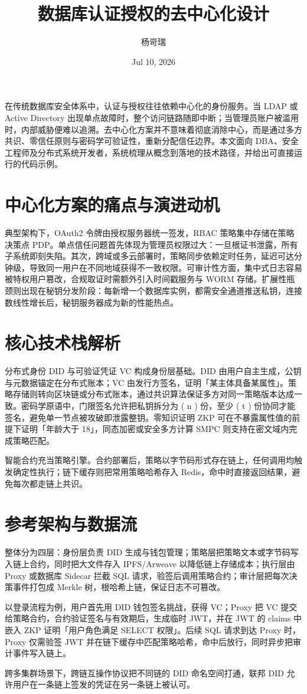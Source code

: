 \title{数据库认证授权的去中心化设计}
\author{杨岢瑞}
\date{Jul 10, 2026}
\maketitle
在传统数据库安全体系中，认证与授权往往依赖中心化的身份服务。当 LDAP 或 Active Directory 出现单点故障时，整个访问链路随即中断；当管理员账户被滥用时，内部威胁便难以追溯。去中心化方案并不意味着彻底消除中心，而是通过多方共识、零信任原则与密码学可验证性，重新分配信任边界。本文面向 DBA、安全工程师及分布式系统开发者，系统梳理从概念到落地的技术路径，并给出可直接运行的代码示例。\par
\chapter{中心化方案的痛点与演进动机}
典型架构下，OAuth2 令牌由授权服务器统一签发，RBAC 策略集中存储在策略决策点 PDP。单点信任问题首先体现为管理员权限过大：一旦根证书泄露，所有子系统即刻失陷。其次，跨域或多云部署时，策略同步依赖定时任务，延迟可达分钟级，导致同一用户在不同地域获得不一致权限。可审计性方面，集中式日志容易被特权用户篡改，合规取证时需额外引入时间戳服务与 WORM 存储。扩展性瓶颈则出现在秘钥分发阶段：每新增一个数据库实例，都需安全通道推送私钥，连接数线性增长后，秘钥服务器成为新的性能热点。\par
\chapter{核心技术栈解析}
分布式身份 DID 与可验证凭证 VC 构成身份层基础。DID 由用户自主生成，公钥与元数据锚定在分布式账本；VC 由发行方签名，证明「某主体具备某属性」。策略存储则转向区块链或分布式账本，通过共识算法保证多方对同一策略版本达成一致。密码学原语中，门限签名允许把私钥拆分为 ( n ) 份，至少 ( t ) 份协同才能签名，避免单一节点被攻破即泄露整钥。零知识证明 ZKP 可在不暴露属性值的前提下证明「年龄大于 18」，同态加密或安全多方计算 SMPC 则支持在密文域内完成策略匹配。\par
智能合约充当策略引擎。合约部署后，策略以字节码形式存在链上，任何调用均触发确定性执行；链下缓存则把常用策略哈希存入 Redis，命中时直接返回结果，避免每次都走链上共识。\par
\chapter{参考架构与数据流}
整体分为四层：身份层负责 DID 生成与钱包管理；策略层把策略文本或字节码写入链上合约，同时把大文件存入 IPFS/Arweave 以降低链上存储成本；执行层由 Proxy 或数据库 Sidecar 拦截 SQL 请求，验签后调用策略合约；审计层把每次决策事件打包成 Merkle 树，根哈希上链，保证日志不可篡改。\par
以登录流程为例，用户首先用 DID 钱包签名挑战，获得 VC；Proxy 把 VC 提交给策略合约，合约验证签名与有效期后，生成临时 JWT，并在 JWT 的 claims 中嵌入 ZKP 证明「用户角色满足 SELECT 权限」。后续 SQL 请求到达 Proxy 时，Proxy 仅需验签 JWT 并在链下缓存中匹配策略哈希，命中后放行，同时异步把审计事件写入链上。\par
跨多集群场景下，跨链互操作协议把不同链的 DID 命名空间打通，联邦 DID 允许用户在一条链上签发的凭证在另一条链上被认可。\par
